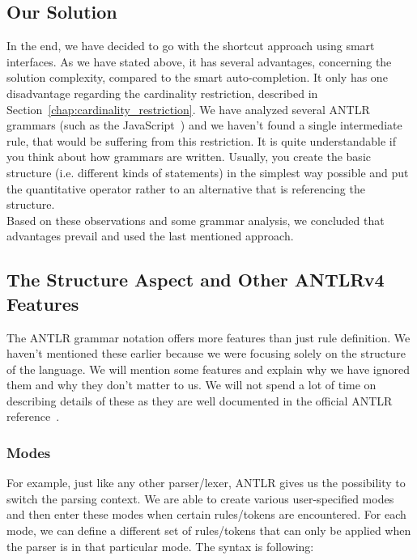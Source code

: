 \subsection{Our Solution}
\label{chap:structure_solution}

In the end, we have decided to go with the shortcut approach using smart interfaces.
As we have stated above, it has several advantages, concerning the solution complexity, compared to the smart auto-completion.
It only has one disadvantage regarding the cardinality restriction, described in Section~\ref{chap:cardinality_restriction}.
We have analyzed several ANTLR grammars (such as the JavaScript~\cite{javascript}) and we haven't found a single intermediate rule, that would be suffering from this restriction.
It is quite understandable if you think about how grammars are written.
Usually, you create the basic structure (i.e. different kinds of statements) in the simplest way possible and put the quantitative operator rather to an alternative that is referencing the structure.
\\

Based on these observations and some grammar analysis, we concluded that advantages prevail and used the last mentioned approach.

\subsection{The Structure Aspect and Other ANTLRv4 Features}
\label{chap:antlr_features}

The ANTLR grammar notation offers more features than just rule definition.
We haven't mentioned these earlier because we were focusing solely on the structure of the language.
We will mention some features and explain why we have ignored them and why they don't matter to us.
We will not spend a lot of time on describing details of these as they are well documented in the official ANTLR reference~\cite{ANTLR4reference}.

\subsubsection{Modes}

For example, just like any other parser/lexer, ANTLR gives us the possibility to switch the parsing context.
We are able to create various user-specified modes and then enter these modes when certain rules/tokens are encountered.
For each mode, we can define a different set of rules/tokens that can only be applied when the parser is in that particular mode.
The syntax is following:

